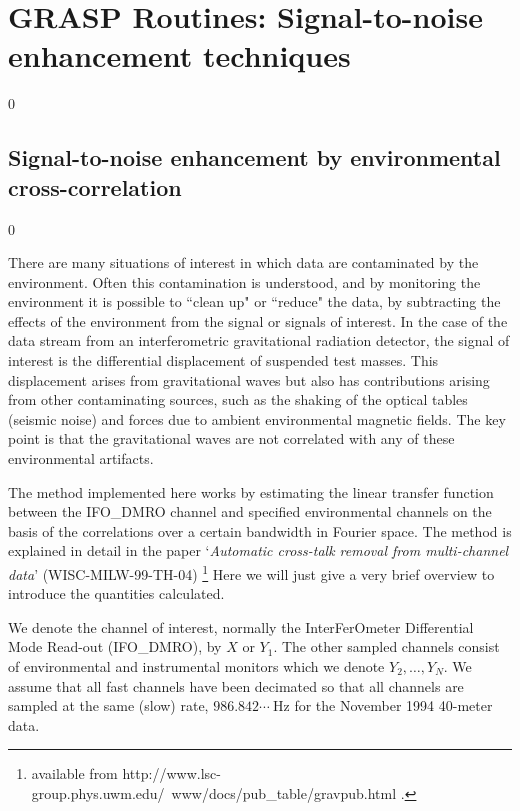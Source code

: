 \section{GRASP Routines: Signal-to-noise enhancement techniques}
\label{s:correlation}
\setcounter{equation}0

\subsection{Signal-to-noise enhancement by environmental cross-correlation}
\setcounter{equation}0
\label{ss:cross-correlation}

There are many situations of interest in which data are contaminated
by the environment.  Often this contamination is understood, and by
monitoring the environment it is possible to ``clean up" or ``reduce"
the data, by subtracting the effects of the environment from the
signal or signals of interest.  In the case of the data stream from an
interferometric gravitational radiation detector, the signal of
interest is the differential displacement of suspended
test masses.  This displacement arises from gravitational waves but
also has contributions arising from other contaminating sources, such
as the shaking of the optical tables (seismic noise) and forces due to
ambient environmental magnetic fields.  The key point is that the
gravitational waves are not correlated with any of these environmental
artifacts.

The method implemented here works by estimating the linear transfer
function between the IFO\_DMRO channel and specified environmental
channels on the basis of the correlations over a certain bandwidth in
Fourier space.  The method is explained in detail in the paper
`\emph{Automatic cross-talk removal from multi-channel data}'
(WISC-MILW-99-TH-04)%
\footnote{available from
{http://www.lsc-group.phys.uwm.edu/~www/docs/pub_table/gravpub.html}
.}
Here we will just give a very brief overview to introduce the quantities calculated.

We denote the channel of interest, normally the InterFerOmeter Differential
Mode Read-out (IFO\_DMRO), by $X$ or $Y_1$.  The other sampled channels consist
of environmental and instrumental monitors which we denote
$Y_2,\dots,Y_N$.  We assume that all fast channels have been decimated
so that all channels are sampled at the same (slow) rate,
$986.842\cdots\ $Hz for the November 1994 40-meter data.


